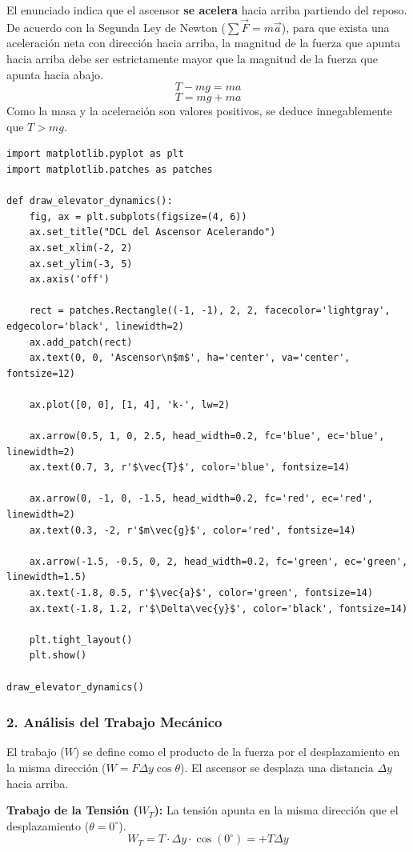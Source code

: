 \documentclass[12pt, a4paper]{article}
\begin{document}
El enunciado indica que el ascensor \textbf{se acelera} hacia arriba partiendo del reposo. De acuerdo con la Segunda Ley de Newton ($\sum \vec{F} = m\vec{a}$), para que exista una aceleración neta con dirección hacia arriba, la magnitud de la fuerza que apunta hacia arriba debe ser estrictamente mayor que la magnitud de la fuerza que apunta hacia abajo.
$$T - mg = ma$$
$$T = mg + ma$$
Como la masa y la aceleración son valores positivos, se deduce innegablemente que $T > mg$.

\begin{lstlisting}
import matplotlib.pyplot as plt
import matplotlib.patches as patches

def draw_elevator_dynamics():
    fig, ax = plt.subplots(figsize=(4, 6))
    ax.set_title("DCL del Ascensor Acelerando")
    ax.set_xlim(-2, 2)
    ax.set_ylim(-3, 5)
    ax.axis('off')

    rect = patches.Rectangle((-1, -1), 2, 2, facecolor='lightgray', edgecolor='black', linewidth=2)
    ax.add_patch(rect)
    ax.text(0, 0, 'Ascensor\n$m$', ha='center', va='center', fontsize=12)

    ax.plot([0, 0], [1, 4], 'k-', lw=2)

    ax.arrow(0.5, 1, 0, 2.5, head_width=0.2, fc='blue', ec='blue', linewidth=2)
    ax.text(0.7, 3, r'$\vec{T}$', color='blue', fontsize=14)

    ax.arrow(0, -1, 0, -1.5, head_width=0.2, fc='red', ec='red', linewidth=2)
    ax.text(0.3, -2, r'$m\vec{g}$', color='red', fontsize=14)

    ax.arrow(-1.5, -0.5, 0, 2, head_width=0.2, fc='green', ec='green', linewidth=1.5)
    ax.text(-1.8, 0.5, r'$\vec{a}$', color='green', fontsize=14)
    ax.text(-1.8, 1.2, r'$\Delta\vec{y}$', color='black', fontsize=14)

    plt.tight_layout()
    plt.show()

draw_elevator_dynamics()
\end{lstlisting}

\subsubsection*{2. Análisis del Trabajo Mecánico}
El trabajo ($W$) se define como el producto de la fuerza por el desplazamiento en la misma dirección ($W = F \Delta y \cos\theta$). El ascensor se desplaza una distancia $\Delta y$ hacia arriba.

\textbf{Trabajo de la Tensión ($W_T$):}
La tensión apunta en la misma dirección que el desplazamiento ($\theta = 0^\circ$).
$$W_T = T \cdot \Delta y \cdot \cos(0^\circ) = +T \Delta y$$
\end{document}
